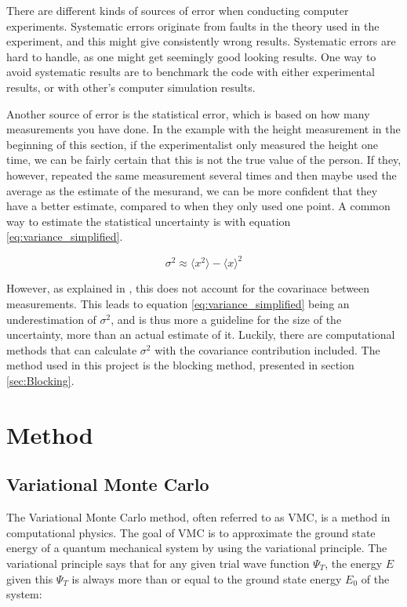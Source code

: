 \documentclass[norsk,a4paper,12pt]{article}
\begin{document}
There are different kinds of sources of error when conducting computer experiments. Systematic errors originate from faults in the theory used in the experiment, and this might give consistently wrong results. Systematic errors are hard to handle, as one might get seemingly good looking results. One way to avoid systematic results are to benchmark the code with either experimental results, or with other's computer simulation results. \par 
\vspace{3mm}
Another source of error is the statistical error, which is based on how many measurements you have done. In the example with the height measurement in the beginning of this section, if the experimentalist only measured the height one time, we can be fairly certain that this is not the true value of the person. If they, however, repeated the same measurement several times and then maybe used the average as the estimate of the mesurand, we can be more confident that they have a better estimate, compared to when they only used one point. A common way to estimate the statistical uncertainty is with equation \ref{eq:variance_simplified}.

\begin{equation}
\label{eq:variance_simplified}
\sigma^2 \approx \langle x^2 \rangle - \langle x \rangle^2
\end{equation}

However, as explained in \cite{Nordhagen}, this does not account for the covarinace between measurements. This leads to equation \ref{eq:variance_simplified} being an underestimation of $\sigma^2$, and is thus more a guideline for the size of the uncertainty, more than an actual estimate of it. Luckily, there are computational methods that can calculate $\sigma^2$ with the covariance contribution included. The method used in this project is the blocking method, presented in section \ref{sec:Blocking}.

\section{Method} \label{sec:Method}

\subsection{Variational Monte Carlo}
The Variational Monte Carlo method, often referred to as VMC, is a method in computational physics. The goal of VMC is to approximate the ground state energy of a quantum mechanical system by using the variational principle. The variational principle says that for any given trial wave function $\Psi_T$, the energy $E$ given this $\Psi_T$ is always more than or equal to the ground state energy $E_0$ of the system:
\end{document}
